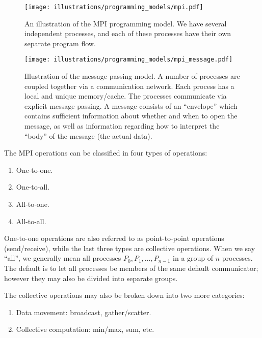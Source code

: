 \begin{figure}[htbp]
  \centering
  \texttt{[image: illustrations/programming\_models/mpi.pdf]}
  \caption{An illustration of the MPI programming model. We have several independent processes, and each of these processes have their own separate program flow.}
  \label{fig:mpi}
\end{figure}

\begin{figure}[htbp]
  \centering
  \texttt{[image: illustrations/programming\_models/mpi\_message.pdf]}
  \caption{Illustration of the message passing model. A number of processes are coupled together via a communication network. Each process has a local and unique memory/cache. The processes communicate via explicit message passing. A
message consists of an ``envelope'' which contains sufficient information about whether and when to open the message, as well as information regarding how to interpret the ``body'' of the message (the actual data).}
  \label{fig:message}
\end{figure}

The MPI operations can be classified in four types of operations:
\begin{enumerate}
  \item One-to-one.
  \item One-to-all.
  \item All-to-one.
  \item All-to-all.
\end{enumerate}

One-to-one operations are also referred to as point-to-point operations (send/receive), while the last three types are collective operations. When we say ``all'', we generally mean all processes $P_0, P_1, \dots, P_{n-1}$ in a group of $n$ processes. The default is to let all processes be members of the same default communicator; however they may also be divided into separate groups.

The collective operations may also be broken down into two more categories:
\begin{enumerate}[label=\alph*)]
  \item Data movement: broadcast, gather/scatter.
  \item Collective computation: min/max, sum, etc.
\end{enumerate}


